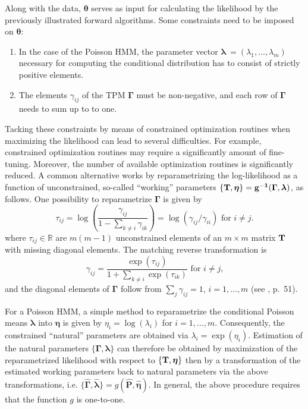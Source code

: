 \documentclass[]{interact}\usepackage[]{graphicx}\usepackage[dvipsnames]{xcolor}
\theoremstyle{plain}%
\theoremstyle{definition}
\theoremstyle{remark}
\begin{document}
Along with the data, $\bm{\theta}$ serves as input for calculating the likelihood by the previously illustrated forward algorithms. Some constraints need to be imposed on $\bm{\theta}$:
\begin{enumerate}
\item In the case of the Poisson HMM, the parameter vector $\bm{\lambda}\ = (\lambda_1, \dots, \lambda_m)$ necessary for computing the conditional distribution has to consist of strictly positive elements.
\item The elements $\gamma_{ij}$ of the TPM $\bm{\Gamma}$ must be non-negative, and each row of $\bm{\Gamma}$ needs to sum up to to one.
\end{enumerate}
Tacking these constraints by means of constrained optimization routines when maximizing the likelihood can lead to several difficulties. For example, constrained optimization routines may require a significantly amount of fine-tuning. Moreover, the number of available optimization routines is significantly reduced. A common alternative works by reparametrizing the log-likelihood as a function of unconstrained, so-called ``working'' parameters $\{\bf{T}, \bm{\eta}\}= g^{-1}(\bm{\Gamma}, \bm{\lambda})$, as follows.
One possibility to reparametrize $\bm{\Gamma}$ is given by
\begin{equation*}
\tau_{ij} = \log\left(\frac{\gamma_{ij}}{1 - \sum_{k \neq i} \gamma_{ik}}\right) = \log(\gamma_{ij}/\gamma_{ii}) \text{ for } i \neq j.
\end{equation*}
where $\tau_{ij} \in \mathbb{R}$ are $m(m-1)$ unconstrained elements of an $m \times m$ matrix $\bf{T}$ with missing diagonal elements. The matching reverse transformation is
\begin{equation*}
\gamma_{ij} = \frac{\exp(\tau_{ij})}{1 + \sum_{k \neq i} \exp(\tau_{ik})} \text{ for } i \neq j\text{,}
\end{equation*}
and the diagonal elements of $\bm{\Gamma}$ follow from $\sum_j \gamma_{ij} = 1$, $i = 1,...,m$ (see \cite{zucchini}, p.~51).

For a Poisson HMM, a simple method to reparametrize the conditional Poisson means $\bm{\lambda}$ into $\bm{\eta}$ is given by $\eta_i = \log(\lambda_i)$ for $i = 1, \ldots, m$.
Consequently, the constrained ``natural'' parameters are obtained via $\lambda_i = \exp(\eta_i)$.
Estimation of the natural parameters $\{\bm{\Gamma}, \bm{\lambda}\}$ can therefore be obtained by maximization of the reparametrized likelihood with respect to $\{\bf{T}, \bm{\eta}\}$ then by a transformation of the estimated working parameters back to natural parameters via the above transformations, i.e. $\{\hat{\bm{\Gamma}}, \hat{\bm{\lambda}}\} = g(\hat{\bm{P}}, \hat{\bm{\eta}})$.
In general, the above procedure requires that the function $g$ is one-to-one.
\end{document}
